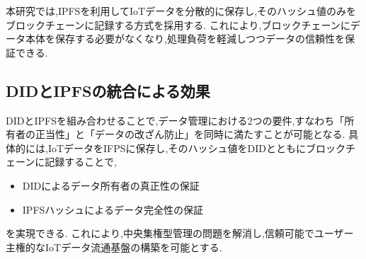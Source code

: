 \documentclass[a4paper,9pt,twocolumn]{ltjsarticle} %
\begin{document}
本研究では,IPFSを利用してIoTデータを分散的に保存し,そのハッシュ値のみをブロックチェーンに記録する方式を採用する.
これにより,ブロックチェーンにデータ本体を保存する必要がなくなり,処理負荷を軽減しつつデータの信頼性を保証できる.


\subsection{DIDとIPFSの統合による効果}
DIDとIPFSを組み合わせることで,データ管理における2つの要件,すなわち「所有者の正当性」と「データの改ざん防止」を同時に満たすことが可能となる.
具体的には,IoTデータをIFPSに保存し,そのハッシュ値をDIDとともにブロックチェーンに記録することで,
\begin{itemize}
  \item DIDによるデータ所有者の真正性の保証
  \item IPFSハッシュによるデータ完全性の保証
\end{itemize}
を実現できる.
これにより,中央集権型管理の問題を解消し,信頼可能でユーザー主権的なIoTデータ流通基盤の構築を可能とする.
\end{document}
